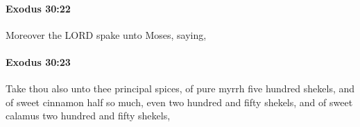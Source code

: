 		\paragraph{Exodus 30:22} %
			\label{EXODUS-30-22}

			Moreover the LORD spake unto Moses, saying,


		\paragraph{Exodus 30:23} %
			\label{EXODUS-30-23}

			Take thou also unto thee principal spices, of pure myrrh five hundred shekels, and of sweet cinnamon half so much, even two hundred and fifty shekels, and of sweet calamus two hundred and fifty shekels,


